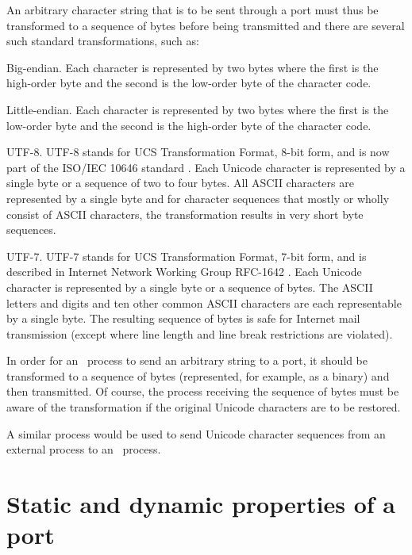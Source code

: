 An arbitrary character string that is to be sent through a port must thus be transformed to a
sequence of bytes before being transmitted and there are several such standard transformations,
such as:
\begin{Lentry}
\item[Big-endian.]
Each character is represented by two bytes where the first is the high-order byte and
the second is the low-order byte of the character code.
\item[Little-endian.]
Each character is represented by two bytes where the first is the low-order byte and
the second is the high-order byte of the character code.
\item[UTF-8.]
UTF-8 stands for UCS Transformation Format, 8-bit form, and is now part of the ISO/IEC
10646 standard \cite{utf8}.  Each Unicode character is represented by a single byte or
a sequence of two to four bytes.  All ASCII characters are represented by a single byte
and for character sequences that mostly or wholly consist of ASCII characters, the
transformation results in very short byte sequences.
\item[UTF-7.]
UTF-7 stands for UCS Transformation Format, 7-bit form, and is described in Internet Network
Working Group RFC-1642 \cite{rfc1642}.  Each Unicode character is represented by a single byte
or a sequence of bytes.  The ASCII letters and digits and ten other common ASCII characters
are each representable by a single byte.  The resulting sequence of bytes is safe for
Internet mail transmission (except where line length and line break restrictions are violated).
\end{Lentry}

In order for an \Erlang\ process to send an arbitrary string to a port, it should be transformed
to a sequence of
bytes (represented, for example, as a binary) and then transmitted.  Of course, the process
receiving the sequence of bytes must be aware of the transformation if the original Unicode
characters are to be restored.

A similar process would be used to send Unicode character sequences from an external process to
an \Erlang\ process.
\fi

\section{Static and dynamic properties of a port}

